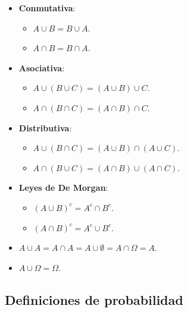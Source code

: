 \documentclass[
]{article}
\providecommand{\tightlist}{%
  \setlength{\itemsep}{0pt}\setlength{\parskip}{0pt}}
\begin{document}
\begin{itemize}
\tightlist
\item
  \textbf{Conmutativa}:

  \begin{itemize}
  \tightlist
  \item
    \(A\cup B= B\cup A\).
  \item
    \(A\cap B= B\cap A\).
  \end{itemize}
\item
  \textbf{Asociativa}:

  \begin{itemize}
  \tightlist
  \item
    \(A \cup (B \cup C) = (A \cup B) \cup C\).
  \item
    \(A \cap (B \cap C) = (A \cap B) \cap C\).
  \end{itemize}
\item
  \textbf{Distributiva}:

  \begin{itemize}
  \tightlist
  \item
    \(A \cup (B \cap C) = (A \cup B) \cap (A \cup C)\).
  \item
    \(A \cap (B \cup C) = (A \cap B) \cup (A \cap C)\).
  \end{itemize}
\item
  \textbf{Leyes de De Morgan}:

  \begin{itemize}
  \tightlist
  \item
    \((A \cup B)^c = A^c \cap B^c\).
  \item
    \((A \cap B)^c = A^c \cup B^c\).
  \end{itemize}
\item
  \(A \cup A = A \cap A = A \cup \emptyset = A \cap \Omega = A\).
\item
  \(A \cup \Omega = \Omega\).
\end{itemize}

\hypertarget{definiciones-de-probabilidad}{%
\subsection{Definiciones de
probabilidad}\label{definiciones-de-probabilidad}}
\end{document}
